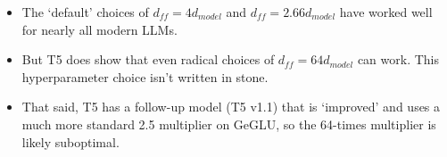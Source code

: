 \begin{itemize}
  \item The `default' choices of $d_{ff} = 4 d_{model}$ and $d_{ff} = 2.66 d_{model}$ have worked well for nearly all modern LLMs.
  \medskip
  \item But T5 does show that even radical choices of $d_{ff} = 64 d_{model}$ can work. This hyperparameter choice isn't written in stone.
  \medskip
  \item That said, T5 has a follow-up model (T5 v1.1) that is `improved' and uses a much more standard 2.5 multiplier on GeGLU, so the 64-times multiplier is likely suboptimal.
\end{itemize}
